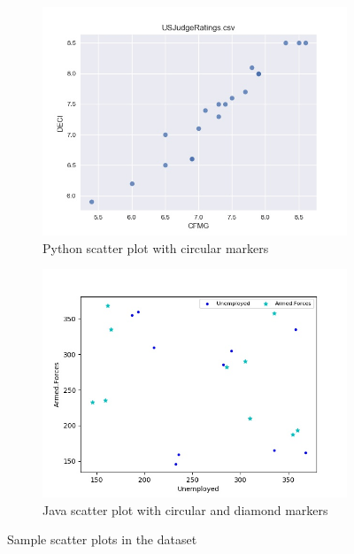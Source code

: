 \documentclass[12pt, a4paper,oneside]{report}
\begin{document}
\begin{figure}[!htb]
	\begin{subfigure}{.6\textwidth}
		\centering
		\includegraphics[width=.8\linewidth]{scatter11}
		\caption{Python scatter plot with circular markers }
		\label{fig:scatter1}
	\end{subfigure}%
	\begin{subfigure}{.5\textwidth}
		\centering
		\includegraphics[width=.8\linewidth]{scatter1}
		\caption{Java scatter plot with circular and diamond markers}
		\label{fig:scatter2}
	\end{subfigure}
	\caption{Sample scatter plots in the dataset}
	\label{fig:scatters}
\end{figure}
\end{document}
